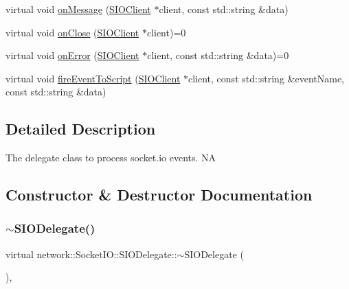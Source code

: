 \begin{DoxyCompactItemize}
\item 
virtual void \hyperlink{classnetwork_1_1SocketIO_1_1SIODelegate_aa498be5838a65bdb5a42707de71a5d2a}{on\+Message} (\hyperlink{classnetwork_1_1SIOClient}{S\+I\+O\+Client} $\ast$client, const std\+::string \&data)
\item 
virtual void \hyperlink{classnetwork_1_1SocketIO_1_1SIODelegate_ac70f5e19ee755ac6dbc608018e2176f4}{on\+Close} (\hyperlink{classnetwork_1_1SIOClient}{S\+I\+O\+Client} $\ast$client)=0
\item 
virtual void \hyperlink{classnetwork_1_1SocketIO_1_1SIODelegate_a906cad51ad2efe52ffe41047239c6f5d}{on\+Error} (\hyperlink{classnetwork_1_1SIOClient}{S\+I\+O\+Client} $\ast$client, const std\+::string \&data)=0
\item 
virtual void \hyperlink{classnetwork_1_1SocketIO_1_1SIODelegate_abbe454ccb39be64c6904658a3afdf9ca}{fire\+Event\+To\+Script} (\hyperlink{classnetwork_1_1SIOClient}{S\+I\+O\+Client} $\ast$client, const std\+::string \&event\+Name, const std\+::string \&data)
\end{DoxyCompactItemize}


\subsection{Detailed Description}
The delegate class to process socket.\+io events.  NA 

\subsection{Constructor \& Destructor Documentation}
\mbox{\label{classnetwork_1_1SocketIO_1_1SIODelegate_ab487c39e21b09a5538d17a9ac47cfcc0}} 
\subsubsection{\texorpdfstring{$\sim$\+S\+I\+O\+Delegate()}{~SIODelegate()}\hspace{0.1cm}{\footnotesize\ttfamily [1/2]}}
{\footnotesize\ttfamily virtual network\+::\+Socket\+I\+O\+::\+S\+I\+O\+Delegate\+::$\sim$\+S\+I\+O\+Delegate (\begin{DoxyParamCaption}{ }\end{DoxyParamCaption})\hspace{0.3cm}{\ttfamily [inline]}, {\ttfamily [virtual]}}


